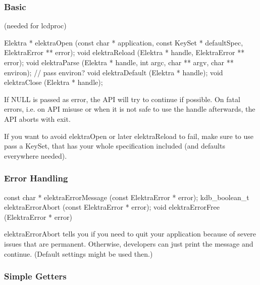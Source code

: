 \subsubsection*{Basic}

(needed for lcdproc)


\begin{DoxyCode}
Elektra * elektraOpen (\textcolor{keyword}{const} \textcolor{keywordtype}{char} * application, \textcolor{keyword}{const} KeySet * defaultSpec, ElektraError ** error);
\textcolor{keywordtype}{void} elektraReload (Elektra * handle, ElektraError ** error);
\textcolor{keywordtype}{void} elektraParse (Elektra * handle, \textcolor{keywordtype}{int} argc, \textcolor{keywordtype}{char} ** argv, \textcolor{keywordtype}{char} ** environ); \textcolor{comment}{// pass environ?}
\textcolor{keywordtype}{void} elektraDefault (Elektra * handle);
\textcolor{keywordtype}{void} elektraClose (Elektra * handle);
\end{DoxyCode}


If {\ttfamily N\+U\+LL} is passed as error, the A\+PI will try to continue if possible. On fatal errors, i.\+e. on A\+PI misuse or when it is not safe to use the handle afterwards, the A\+PI aborts with {\ttfamily exit}.

If you want to avoid {\ttfamily elektra\+Open} or later {\ttfamily elektra\+Reload} to fail, make sure to use pass a {\ttfamily Key\+Set}, that has your whole specification included (and defaults everywhere needed).

\subsubsection*{Error Handling}


\begin{DoxyCode}
\textcolor{keyword}{const} \textcolor{keywordtype}{char} * elektraErrorMessage (\textcolor{keyword}{const} ElektraError * error);
kdb\_boolean\_t elektraErrorAbort (\textcolor{keyword}{const} ElektraError * error);
\textcolor{keywordtype}{void} elektraErrorFree (ElektraError * error)
\end{DoxyCode}


{\ttfamily elektra\+Error\+Abort} tells you if you need to quit your application because of severe issues that are permanent. Otherwise, developers can just print the message and continue. (Default settings might be used then.)

\subsubsection*{Simple Getters}

